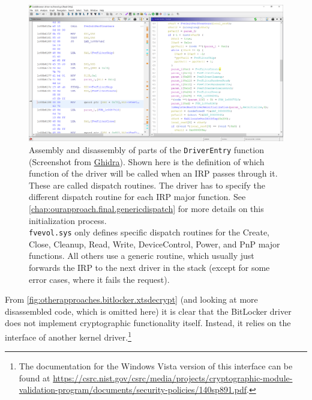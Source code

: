 \begin{figure}[htb!]
	\center
	\includegraphics[scale=0.39]{../img/otherapproaches.bitlocker.driverentry.png}
	\caption[
		Assembly and disassembly of parts of the \texttt{DriverEntry} function
	]{
		Assembly and disassembly of parts of the \texttt{DriverEntry} function (Screenshot from \href{https://www.ghidra-sre.org}{Ghidra}). Shown here is the definition of which function of the driver will be called when an IRP passes through it. These are called dispatch routines. The driver has to specify the different dispatch routine for each IRP major function. See \autoref{chap:ourapproach.final.genericdispatch} for more details on this initialization process.\\
		\texttt{fvevol.sys} only defines specific dispatch routines for the Create, Close, Cleanup, Read, Write, DeviceControl, Power, and PnP major functions. All others use a generic routine, which usually just forwards the IRP to the next driver in the stack (except for some error cases, where it fails the request).
	}
	\label{fig:otherapproaches.bitlocker.driverentry}
\end{figure}

From \autoref{fig:otherapproaches.bitlocker.xtsdecrypt} (and looking at more disassembled code, which is omitted here) it is clear that the BitLocker driver does not implement cryptographic functionality itself. Instead, it relies on the interface of another kernel driver.\footnote{\label{fn:otherapproaches.bitlocker.ksecdd} The documentation for the Windows Vista version of this interface can be found at \url{https://csrc.nist.gov/csrc/media/projects/cryptographic-module-validation-program/documents/security-policies/140sp891.pdf}.}

